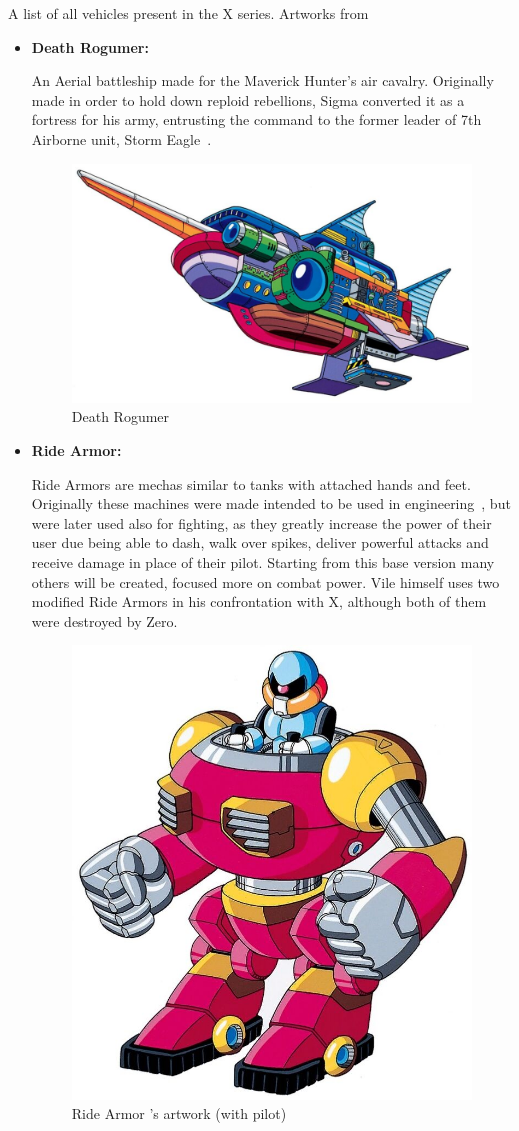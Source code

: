 A list of all vehicles present in the X series. Artworks from~\cite{book:MMX_Complete_art}
\begin{itemize}
	\item \hypertarget{vehicle:Death_Rogumer}{\textbf{Death Rogumer:}}
	An Aerial battleship made for the Maverick Hunter's air cavalry. Originally made in order to hold down reploid rebellions, Sigma converted it as a fortress 
	for his army, entrusting the command to the former leader of 7th Airborne unit, Storm Eagle~\cite{wayback:X_resources}.
	\begin{figure}[htp]
		\centering
		\includegraphics[width=\linewidth]{figures/X1/Storm_eagle/DeathRogumer.jpg}
		\caption{Death Rogumer}
	\end{figure}
	\item \hypertarget{vehicle:Ride_Armor}{\textbf{Ride Armor:}}
	Ride Armors are mechas similar to tanks with attached hands and feet. Originally these machines were made intended to be used in engineering~\cite{wayback:X_resources}, but were later used also for fighting, as they greatly increase the power of their user due being able to dash, walk over spikes, deliver powerful attacks and receive damage in place of 
	their pilot. Starting from this base version many others will be created, focused more on combat power. Vile himself uses two modified Ride Armors in his confrontation with X, although both of them were destroyed by Zero.
	\begin{figure}[htp]
		\centering
		\includegraphics[width=0.4\linewidth]{figures/X1/Enemies/ArmorSoldier.jpg}
		\caption{Ride Armor 's artwork (with pilot)}
	\end{figure}
	

\end{itemize}
